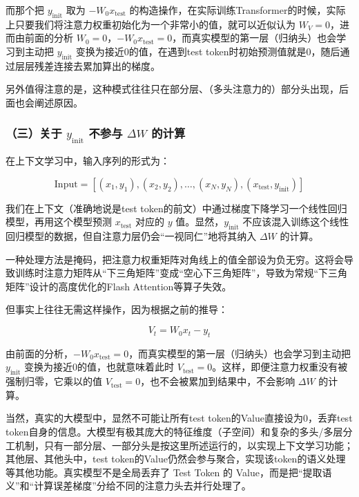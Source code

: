 而那个把 \(y_{\mathrm{init}}\) 取为 \(-W_0x_{\mathrm{test}}\) 的构造操作，在实际训练Transformer的时候，实际上只要我们将注意力权重初始化为一个非常小的值，就可以近似认为 \(W_V=0\)，进而由前面的分析 \(W_0=0\)，\(-W_0x_{\mathrm{test}}=0\)，而真实模型的第一层（归纳头）也会学习到主动把 \(y_{\mathrm{init}}\) 变换为接近0的值，在遇到test token时初始预测值就是0，随后通过层层残差连接去累加算出的梯度。

另外值得注意的是，这种模式往往只在部分层、（多头注意力的）部分头出现，后面也会阐述原因。

\hypertarget{ux4e09ux5173ux4e8e-y_mathrminit-ux4e0dux53c2ux4e0e-delta-w-ux7684ux8ba1ux7b97}{%
\subsubsection{\texorpdfstring{（三）关于 \(y_{\mathrm{init}}\) 不参与 \(\Delta W\) 的计算}{（三）关于 y\_\{\textbackslash mathrm\{init\}\} 不参与 \textbackslash Delta W 的计算}}\label{ux4e09ux5173ux4e8e-y_mathrminit-ux4e0dux53c2ux4e0e-delta-w-ux7684ux8ba1ux7b97}}

在上下文学习中，输入序列的形式为：

\[
\mathrm{Input}=[(x_1,y_1),(x_2,y_2),\ldots,(x_N,y_N),(x_{\mathrm{test}},y_{\mathrm{init}})]
\]

我们在上下文（准确地说是test token的前文）中通过梯度下降学习一个线性回归模型，再用这个模型预测 \(x_{\mathrm{test}}\) 对应的 \(y\) 值。显然，\(y_{\mathrm{init}}\) 不应该混入训练这个线性回归模型的数据，但自注意力层仍会``一视同仁''地将其纳入 \(\Delta W\) 的计算。

一种处理方法是掩码，把注意力权重矩阵对角线上的值全部设为负无穷。这将会导致训练时注意力矩阵从``下三角矩阵''变成``空心下三角矩阵''，导致为常规``下三角矩阵''设计的高度优化的Flash Attention等算子失效。

但事实上往往无需这样操作，因为根据之前的推导：

\[
V_t = W_0 x_t - y_t
\]

由前面的分析，\(-W_0x_{\mathrm{test}}=0\)，而真实模型的第一层（归纳头）也会学习到主动把 \(y_{\mathrm{init}}\) 变换为接近0的值，也就意味着此时 \(V_{\mathrm{test}}=0\)。这样，即便注意力权重没有被强制归零，它乘以的值 \(V_{\mathrm{test}}=0\)，也不会被累加到结果中，不会影响 \(\Delta W\) 的计算。

当然，真实的大模型中，显然不可能让所有test token的Value直接设为0，丢弃test token自身的信息。大模型有极其庞大的特征维度（子空间）和复杂的多头/多层分工机制，只有一部分层、一部分头是按这里所述运行的，以实现上下文学习功能；其他层、其他头中，test token的Value仍然会参与聚合，实现该token的语义处理等其他功能。真实模型不是全局丢弃了 Test Token 的 Value，而是把``提取语义''和``计算误差梯度''分给不同的注意力头去并行处理了。

